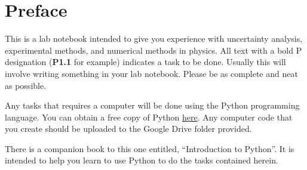 \chapter*{Preface}

This is a lab notebook intended to give you experience with
uncertainty analysis, experimental methods, and numerical methods in
physics.  All text with a bold P designation (\textbf{P1.1} for
example) indicates a task to be done.  Usually this will involve
writing something in your lab notebook.  Please be as complete and
neat as possible.

Any tasks that requires a computer will be done using the Python
programming language.  You can obtain a free copy of Python \href{https://store.enthought.com/downloads/}{here}.  
Any computer code that you create should be uploaded to the Google
Drive folder provided.

There is a companion book to this one entitled, ``Introduction to
Python''.  It is intended to help you learn to use Python to do the
tasks contained herein.  